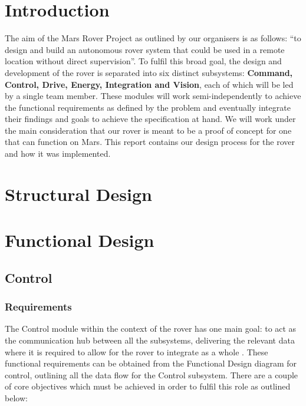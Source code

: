 \documentclass[a4paper]{article}
\begin{document}
\newpage

\section{Introduction}

The aim of the Mars Rover Project as outlined by our organisers is as 
follows: “to design and build an autonomous rover system that could be 
used in a remote location without direct  supervision”\cite{MarsRoverSpec}.  
To fulfil this broad goal, the design and development of the rover is separated into 
six distinct subsystems: \textbf{Command, Control, Drive, Energy, Integration and Vision},
each of which will be led by a single team member. These modules will work semi-independently to 
achieve the functional requirements as defined by the problem and 
eventually integrate their findings and goals to achieve the specification 
at hand. We will work under the main consideration that our rover is meant 
to be a proof of concept for one that can function on Mars. This report 
contains our design process for the rover and how it was implemented.

\section{Structural Design}

\section{Functional Design}

\subsection{Control}

\subsubsection{Requirements}

The Control module within the context of the rover has one main goal: 
to act as the communication hub between all the subsystems, delivering
the relevant data where it is required to allow for the rover to integrate
as a whole \cite{MarsRoverSpec}.  These functional requirements can be 
obtained from the Functional Design diagram for control, outlining all the 
data flow for the Control subsystem. There are a couple of core objectives 
which must be achieved in order to fulfil this role as outlined below:
\end{document}
